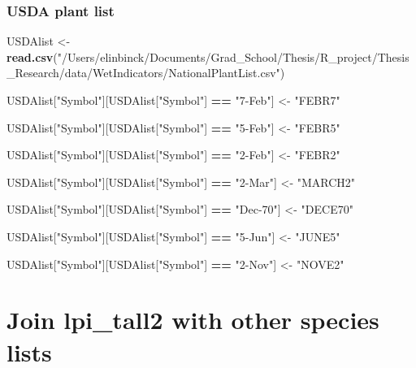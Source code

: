 \documentclass[
]{book}
\newenvironment{Shaded}{\begin{snugshade}}{\end{snugshade}}
\newcommand{\KeywordTok}[1]{\textcolor[rgb]{0.13,0.29,0.53}{\textbf{#1}}}
\newcommand{\NormalTok}[1]{#1}
\newcommand{\OperatorTok}[1]{\textcolor[rgb]{0.81,0.36,0.00}{\textbf{#1}}}
\newcommand{\StringTok}[1]{\textcolor[rgb]{0.31,0.60,0.02}{#1}}
\begin{document}
\hypertarget{usda-plant-list}{%
\subsubsection{USDA plant list}\label{usda-plant-list}}

\begin{Shaded}
\begin{Highlighting}[]
\NormalTok{USDAlist <-}\StringTok{ }\KeywordTok{read.csv}\NormalTok{(}\StringTok{"/Users/elinbinck/Documents/Grad_School/Thesis/R_project/Thesis_Research/data/WetIndicators/NationalPlantList.csv"}\NormalTok{)}

\NormalTok{USDAlist[}\StringTok{"Symbol"}\NormalTok{][USDAlist[}\StringTok{"Symbol"}\NormalTok{] }\OperatorTok{==}\StringTok{ "7-Feb"}\NormalTok{] <-}\StringTok{ "FEBR7"}

\NormalTok{USDAlist[}\StringTok{"Symbol"}\NormalTok{][USDAlist[}\StringTok{"Symbol"}\NormalTok{] }\OperatorTok{==}\StringTok{ "5-Feb"}\NormalTok{] <-}\StringTok{ "FEBR5"}

\NormalTok{USDAlist[}\StringTok{"Symbol"}\NormalTok{][USDAlist[}\StringTok{"Symbol"}\NormalTok{] }\OperatorTok{==}\StringTok{ "2-Feb"}\NormalTok{] <-}\StringTok{ "FEBR2"}

\NormalTok{USDAlist[}\StringTok{"Symbol"}\NormalTok{][USDAlist[}\StringTok{"Symbol"}\NormalTok{] }\OperatorTok{==}\StringTok{ "2-Mar"}\NormalTok{] <-}\StringTok{ "MARCH2"}

\NormalTok{USDAlist[}\StringTok{"Symbol"}\NormalTok{][USDAlist[}\StringTok{"Symbol"}\NormalTok{] }\OperatorTok{==}\StringTok{ "Dec-70"}\NormalTok{] <-}\StringTok{ "DECE70"}

\NormalTok{USDAlist[}\StringTok{"Symbol"}\NormalTok{][USDAlist[}\StringTok{"Symbol"}\NormalTok{] }\OperatorTok{==}\StringTok{ "5-Jun"}\NormalTok{] <-}\StringTok{ "JUNE5"}

\NormalTok{USDAlist[}\StringTok{"Symbol"}\NormalTok{][USDAlist[}\StringTok{"Symbol"}\NormalTok{] }\OperatorTok{==}\StringTok{ "2-Nov"}\NormalTok{] <-}\StringTok{ "NOVE2"}
\end{Highlighting}
\end{Shaded}

\hypertarget{join-lpi_tall2-with-other-species-lists}{%
\section{Join lpi\_tall2 with other species lists}\label{join-lpi_tall2-with-other-species-lists}}
\end{document}
